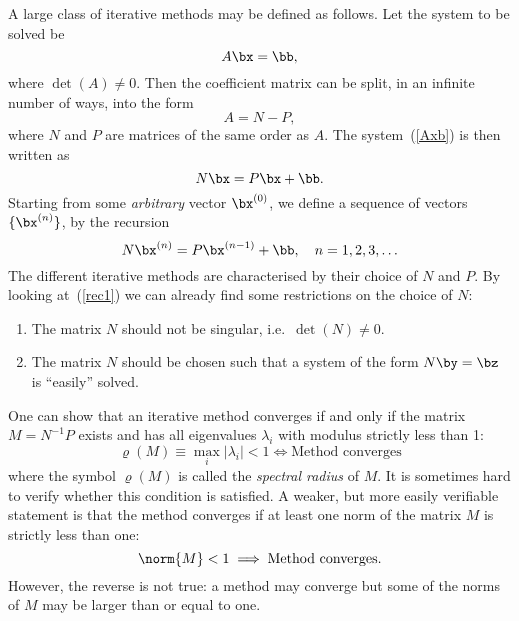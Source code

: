 A large class of iterative methods may be defined as follows.   Let
the system to be solved be
%
\begin{equation}
 A \bx = \bb , \label{Axb}
\end{equation}
%
where $\det(A) \ne 0$.   Then the coefficient matrix can be
split, in an infinite number of ways, into the form
%
\begin{equation*}
  A = N - P ,
\end{equation*}
%
where $N$ and $P$ are matrices of the same order as $A$.    The
system~(\ref{Axb}) is then written as
%
\begin{equation}
  N \bx = P \bx + \bb. \label{NxPxb}
\end{equation}
%
Starting from some \textit{arbitrary} vector $\bx^{(0)}$, we define a
sequence of vectors $\{ \bx^{(n)}\}$, by the recursion
%
\begin{equation}
  N \bx^{(n)} = P \bx^{(n-1)} + \bb, \quad n=1,2,3,\ldots
  \label{rec1}
\end{equation}
%
The different iterative methods are characterised by their choice of
$N$ and $P$.      By looking at~(\ref{rec1}) we can already find
some restrictions on the choice of $N$:
%
\begin{enumerate}
\item The matrix $N$ should not be singular, i.e.\ $\det(N) \ne 0$.
\item The matrix $N$ should be chosen such that a system of the form
  $N \by = \bz$ is ``easily'' solved.
\end{enumerate}
%
One can show that an iterative method converges if and only
if the matrix $M = N^{-1} P$ exists and has all eigenvalues
$\lambda_i$ with modulus strictly less than 1:
%
\begin{equation*}
  \varrho(M) \equiv \max_i | \lambda_i | < 1 \Longleftrightarrow
  \text{Method converges}
\end{equation*}
%
where the symbol $\varrho(M)$ is called the \textit{spectral radius}
of $M$.  It is sometimes hard to verify whether this condition is
satisfied.  A weaker, but more easily verifiable statement is that
the method converges if at least one norm of the matrix $M$
is strictly less than one:
%
\begin{equation*}
  \norm{ M } < 1 \implies \text{Method converges.}
\end{equation*}
%
However, the reverse is not true: a method may converge but some of
the norms of $M$ may be larger than or equal to one.

